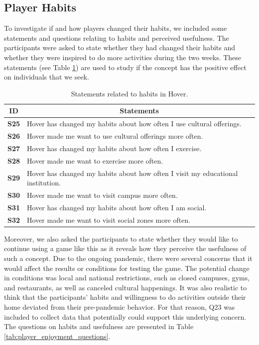 \subsection{Player Habits}
To investigate if and how players changed their habits, we included some statements and questions relating to habits and perceived usefulness. The participants were asked to state whether they had changed their habits and whether they were inspired to do more activities during the two weeks. These statements (see Table \ref{tab:player_habits_statements}) are used to study if the concept has the positive effect on individuals that we seek.

\begin{table}[H]
    \centering
    \begin{tabularx}{0.95\textwidth}{|c|X|}
        \hline
        \textbf{ID} & \multicolumn{1}{c|}{\textbf{Statements}} \\ \hline
        \textbf{S25} & Hover has changed my habits about how often I use cultural offerings. \\
        \textbf{S26} & Hover made me want to use cultural offerings more often.\\ \hline
        \textbf{S27} & Hover has changed my habits about how often I exercise. \\
                \textbf{S28} & Hover made me want to exercise more often. \\ \hline
        \textbf{S29} & Hover has changed my habits about how often I visit my educational institution. \\
        \textbf{S30} & Hover made me want to visit campus more often. \\ \hline
        \textbf{S31} & Hover has changed my habits about how often I am social. \\ \hline
        \textbf{S32} &  Hover made me want to visit social zones more often.\\ \hline
    \end{tabularx}
    \caption{Statements related to habits in Hover.}
    \label{tab:player_habits_statements}
\end{table}

Moreover, we also asked the participants to state whether they would like to continue using a game like this as it reveals how they perceive the usefulness of such a concept. Due to the ongoing pandemic, there were several concerns that it would affect the results or conditions for testing the game. The potential change in conditions was local and national restrictions, such as closed campuses, gyms, and restaurants, as well as canceled cultural happenings. It was also realistic to think that the participants' habits and willingness to do activities outside their home deviated from their pre-pandemic behavior. For that reason, Q23 was included to collect data that potentially could support this underlying concern. The questions on habits and usefulness are presented in Table \ref{tab:player_enjoyment_questions}.

